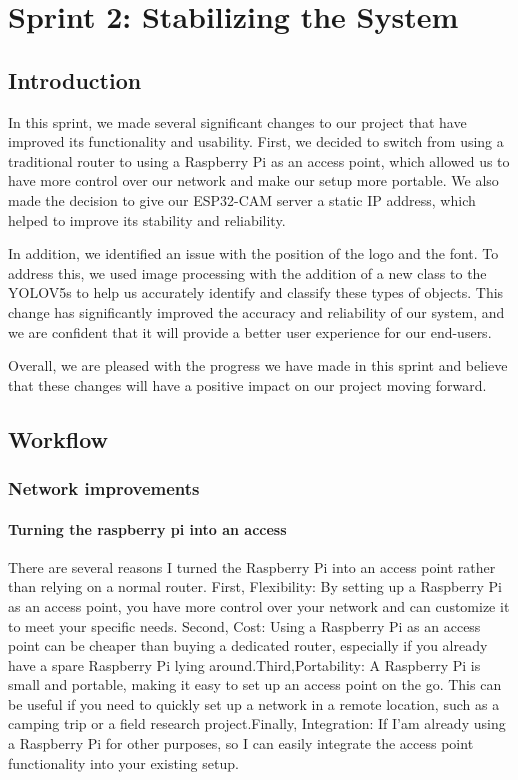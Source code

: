 %
%



\chapter{Sprint 2: Stabilizing the System}
\section{Introduction}
In this sprint, we made several significant changes to our project that have improved its functionality and usability. First, we decided to switch from using a traditional router to using a Raspberry Pi as an access point, which allowed us to have more control over our network and make our setup more portable. We also made the decision to give our ESP32-CAM server a static IP address, which helped to improve its stability and reliability.

In addition, we identified an issue with the position of the logo and the font. To address this, we used image processing with the addition of a new class to the YOLOV5s to help us accurately identify and classify these types of objects. This change has significantly improved the accuracy and reliability of our system, and we are confident that it will provide a better user experience for our end-users.

Overall, we are pleased with the progress we have made in this sprint and believe that these changes will have a positive impact on our project moving forward.
\section{Workflow}
\subsection{Network improvements}
\subsubsection{Turning the raspberry pi into an access}
There are several reasons I turned the Raspberry Pi into an access point rather than relying on a normal router. First, Flexibility: By setting up a Raspberry Pi as an access point, you have more control over your network and can customize it to meet your specific needs. Second, Cost: Using a Raspberry Pi as an access point can be cheaper than buying a dedicated router, especially if you already have a spare Raspberry Pi lying around.Third,Portability: A Raspberry Pi is small and portable, making it easy to set up an access point on the go. This can be useful if you need to quickly set up a network in a remote location, such as a camping trip or a field research project.Finally, Integration: If I'am already using a Raspberry Pi for other purposes, so I can easily integrate the access point functionality into your existing setup.
